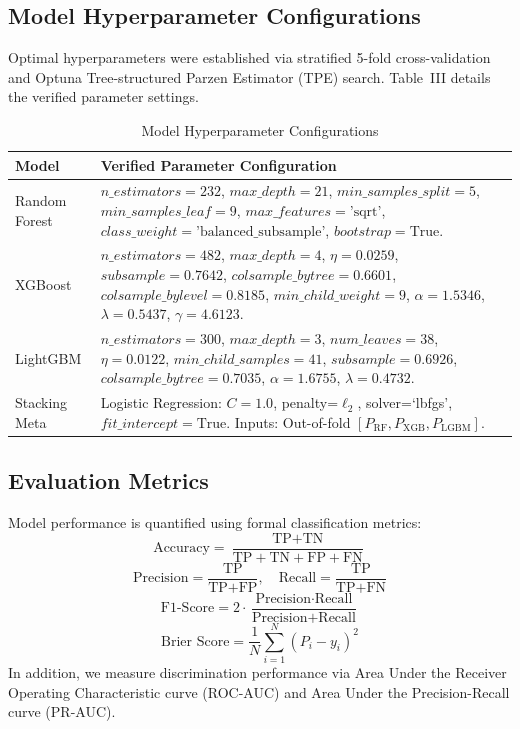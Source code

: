 \documentclass[conference]{IEEEtran}
\begin{document}
\subsection{Model Hyperparameter Configurations}
Optimal hyperparameters were established via stratified 5-fold cross-validation and Optuna Tree-structured Parzen Estimator (TPE) search. Table~III details the verified parameter settings.

\begin{table}[htbp]
\caption{Model Hyperparameter Configurations}
\label{tab:hyperparams}
\centering
\begin{tabularx}{\columnwidth}{lX}
\toprule
\textbf{Model} & \textbf{Verified Parameter Configuration} \\
\midrule
Random Forest & $n\_estimators=232$, $max\_depth=21$, $min\_samples\_split=5$, $min\_samples\_leaf=9$, $max\_features=\text{'sqrt'}$, $class\_weight=\text{'balanced\_subsample'}$, $bootstrap=\text{True}$. \\
\midrule
XGBoost & $n\_estimators=482$, $max\_depth=4$, $\eta=0.0259$, $subsample=0.7642$, $colsample\_bytree=0.6601$, $colsample\_bylevel=0.8185$, $min\_child\_weight=9$, $\alpha=1.5346$, $\lambda=0.5437$, $\gamma=4.6123$. \\
\midrule
LightGBM & $n\_estimators=300$, $max\_depth=3$, $num\_leaves=38$, $\eta=0.0122$, $min\_child\_samples=41$, $subsample=0.6926$, $colsample\_bytree=0.7035$, $\alpha=1.6755$, $\lambda=0.4732$. \\
\midrule
Stacking Meta & Logistic Regression: $C=1.0$, penalty=$\ell_2$, solver=`lbfgs', $fit\_intercept=\text{True}$. Inputs: Out-of-fold $[P_{\text{RF}}, P_{\text{XGB}}, P_{\text{LGBM}}]$. \\
\bottomrule
\end{tabularx}
\end{table}

\subsection{Evaluation Metrics}
Model performance is quantified using formal classification metrics:
\begin{equation}
    \text{Accuracy} = \frac{\text{TP} + \text{TN}}{\text{TP} + \text{TN} + \text{FP} + \text{FN}}
\end{equation}
\begin{equation}
    \text{Precision} = \frac{\text{TP}}{\text{TP} + \text{FP}}, \quad \text{Recall} = \frac{\text{TP}}{\text{TP} + \text{FN}}
\end{equation}
\begin{equation}
    \text{F1-Score} = 2 \cdot \frac{\text{Precision} \cdot \text{Recall}}{\text{Precision} + \text{Recall}}
\end{equation}
\begin{equation}
    \text{Brier Score} = \frac{1}{N} \sum_{i=1}^N (P_i - y_i)^2
\end{equation}
In addition, we measure discrimination performance via Area Under the Receiver Operating Characteristic curve (ROC-AUC) and Area Under the Precision-Recall curve (PR-AUC).
\end{document}
